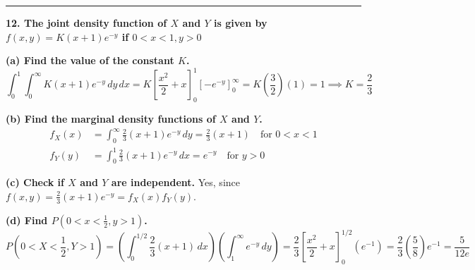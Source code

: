 \documentclass{article}
\begin{document}
\vspace{1em}
\hrule
\vspace{1em}

\textbf{12. The joint density function of $X$ and $Y$ is given by $f(x, y) = K(x+1)e^{-y}$ if $0 < x < 1, y > 0$}

\textbf{(a) Find the value of the constant $K$.}
$$\int_{0}^{1} \int_{0}^{\infty} K(x+1)e^{-y} \,dy \,dx = K \left[ \frac{x^2}{2} + x \right]_0^1 \left[ -e^{-y} \right]_0^\infty = K\left(\frac{3}{2}\right)(1) = 1 \implies K = \frac{2}{3}$$

\textbf{(b) Find the marginal density functions of $X$ and $Y$.}
\begin{align*}
f_X(x) &= \int_{0}^{\infty} \frac{2}{3}(x+1)e^{-y} \,dy = \frac{2}{3}(x+1) \quad \text{for } 0 < x < 1 \\
f_Y(y) &= \int_{0}^{1} \frac{2}{3}(x+1)e^{-y} \,dx = e^{-y} \quad \text{for } y > 0
\end{align*}

\textbf{(c) Check if $X$ and $Y$ are independent.}
Yes, since $f(x,y) = \frac{2}{3}(x+1)e^{-y} = f_X(x)f_Y(y)$.

\textbf{(d) Find $P(0 < x < \frac{1}{2}, y > 1)$.}
$$P\left(0 < X < \frac{1}{2}, Y > 1\right) = \left( \int_{0}^{1/2} \frac{2}{3}(x+1) \,dx \right) \left( \int_{1}^{\infty} e^{-y} \,dy \right) = \frac{2}{3}\left[\frac{x^2}{2} + x\right]_0^{1/2} (e^{-1}) = \frac{2}{3}\left(\frac{5}{8}\right)e^{-1} = \frac{5}{12e}$$
\end{document}
